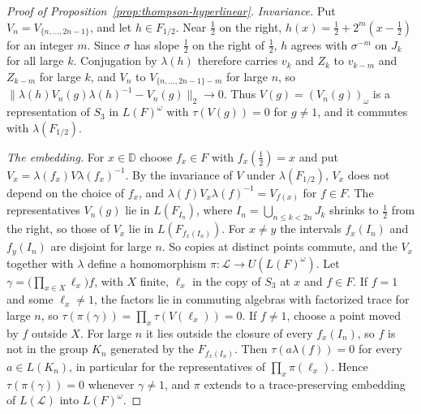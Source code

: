 \begin{proof}[Proof of Proposition~\ref{prop:thompson-hyperlinear}]
\emph{Invariance.} Put $V_n=V_{\{n,\dots,2n-1\}}$, and let $h\in F_{1/2}$. Near $\frac12$ on the right, $h(x)=\frac12+2^m(x-\frac12)$ for an
integer $m$. Since $\sigma$ has slope $\frac12$ on the right of $\frac12$, $h$ agrees with $\sigma^{-m}$ on $J_k$ for all large $k$. Conjugation by $\lambda(h)$ therefore carries $v_k$ and $Z_k$ to
$v_{k-m}$ and $Z_{k-m}$ for large $k$, and $V_n$ to $V_{\{n,\dots,2n-1\}-m}$ for large $n$, so $\|\lambda(h)V_n(g)\lambda(h)^{-1}-V_n(g)\|_2\to0$.
Thus $V(g)=(V_n(g))_\omega$ is a representation of $S_3$ in $L(F)^\omega$ with $\tau(V(g))=0$ for $g\ne1$, and it commutes with $\lambda(F_{1/2})$.

\emph{The embedding.} For $x\in\mathbb D$ choose $f_x\in F$ with $f_x(\frac12)=x$ and put $V_x=\lambda(f_x)V\lambda(f_x)^{-1}$. By the
invariance of $V$ under $\lambda(F_{1/2})$, $V_x$ does not depend on the choice of $f_x$, and $\lambda(f)V_x\lambda(f)^{-1}=V_{f(x)}$ for $f\in F$.
The representatives $V_n(g)$ lie in $L(F_{I_n})$, where $I_n=\bigcup_{n\le k<2n}J_k$ shrinks to $\frac12$ from the right, so those of $V_x$ lie
in $L(F_{f_x(I_n)})$. For $x\ne y$ the intervals $f_x(I_n)$ and $f_y(I_n)$ are disjoint for large $n$. So copies at distinct points commute, and
the $V_x$ together with $\lambda$ define a homomorphism $\pi:\mathcal L\to U(L(F)^\omega)$. Let $\gamma=\bigl(\prod_{x\in X}\ell_x\bigr)f$, with
$X$ finite, $\ell_x$ in the copy of $S_3$ at $x$ and $f\in F$. If $f=1$ and some $\ell_x\ne1$, the factors lie in commuting algebras with
factorized trace for large $n$, so $\tau(\pi(\gamma))=\prod_x\tau(V(\ell_x))=0$. If $f\ne1$, choose a point moved by $f$ outside $X$. For large
$n$ it lies outside the closure of every $f_x(I_n)$, so $f$ is not in the group $K_n$ generated by the $F_{f_x(I_n)}$. Then $\tau(a\lambda(f))=0$
for every $a\in L(K_n)$, in particular for the representatives of $\prod_x\pi(\ell_x)$. Hence $\tau(\pi(\gamma))=0$ whenever $\gamma\ne1$, and
$\pi$ extends to a trace-preserving embedding of $L(\mathcal L)$ into $L(F)^\omega$.
\end{proof}

